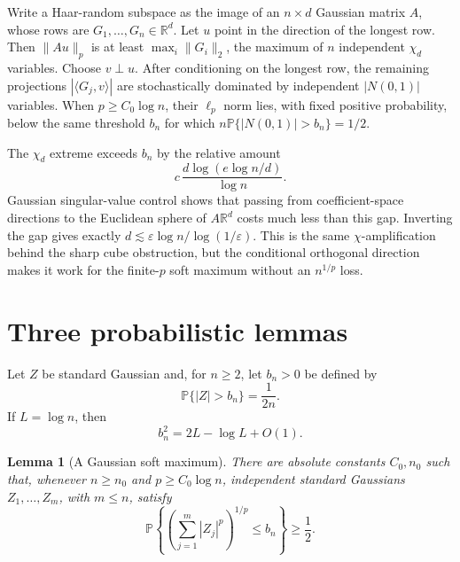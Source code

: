 \documentclass[11pt]{article}
\newtheorem{lemma}[theorem]{Lemma}
\newcommand{\R}{\mathbb R}
\newcommand{\eps}{\varepsilon}
\newcommand{\Prob}{\mathbb P}
\begin{document}
Write a Haar-random subspace as the image of an $n\times d$ Gaussian matrix
$A$, whose rows are $G_1,\ldots,G_n\in\R^d$.  Let $u$ point in the direction
of the longest row.  Then $\|Au\|_p$ is at least
$\max_i\|G_i\|_2$, the maximum of $n$ independent $\chi_d$ variables.
Choose $v\perp u$.  After conditioning on the longest row, the remaining
projections $|\langle G_j,v\rangle|$ are stochastically dominated by
independent $|N(0,1)|$ variables.  When $p\ge C_0\log n$, their $\ell_p$ norm
lies, with fixed positive probability, below the same threshold $b_n$ for
which $n\Prob\{|N(0,1)|>b_n\}=1/2$.

The $\chi_d$ extreme exceeds $b_n$ by the relative amount
\[
 c\,\frac{d\log(e\log n/d)}{\log n}.
\]
Gaussian singular-value control shows that passing from coefficient-space
directions to the Euclidean sphere of $A\R^d$ costs much less than this gap.
Inverting the gap gives exactly
$d\lesssim\eps\log n/\log(1/\eps)$.  This is the same $\chi$-amplification
behind the sharp cube obstruction, but the conditional orthogonal direction
makes it work for the finite-$p$ soft maximum without an $n^{1/p}$ loss.

\section{Three probabilistic lemmas}

Let $Z$ be standard Gaussian and, for $n\ge2$, let $b_n>0$ be defined by
\begin{equation}\label{eq:bn}
       \Prob\{|Z|>b_n\}=\frac1{2n}.
\end{equation}
If $L=\log n$, then
\begin{equation}\label{eq:b-asymp}
       b_n^2=2L-\log L+O(1).
\end{equation}

\begin{lemma}[A Gaussian soft maximum]\label{lem:softmax}
There are absolute constants $C_0,n_0$ such that, whenever
$n\ge n_0$ and $p\ge C_0\log n$, independent standard Gaussians
$Z_1,\ldots,Z_m$, with $m\le n$, satisfy
\[
 \Prob\left\{\left(\sum_{j=1}^m|Z_j|^p\right)^{1/p}\le b_n\right\}
 \ge \frac12.
\]
\end{lemma}
\end{document}
